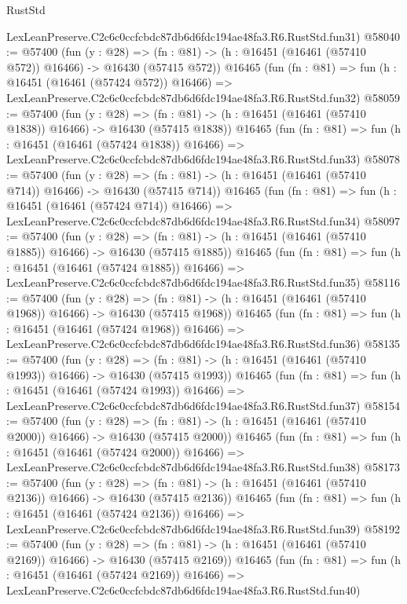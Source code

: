 \begin{lexlean}{RustStd}
\begin{coremodule}
    LexLeanPreserve.C2c6c0ccfcbdc87db6d6fdc194ae48fa3.R6.RustStd.fun31)
@58040 := @57400
    (fun (y : @28) =>
    (fn : @81) -> (h : @16451 (@16461 (@57410 @572)) @16466) -> @16430 (@57415 @572))
    @16465
    (fun (fn : @81) =>
    fun (h : @16451 (@16461 (@57424 @572)) @16466) =>
    LexLeanPreserve.C2c6c0ccfcbdc87db6d6fdc194ae48fa3.R6.RustStd.fun32)
@58059 := @57400
    (fun (y : @28) =>
    (fn : @81) -> (h : @16451 (@16461 (@57410 @1838)) @16466) -> @16430 (@57415 @1838))
    @16465
    (fun (fn : @81) =>
    fun (h : @16451 (@16461 (@57424 @1838)) @16466) =>
    LexLeanPreserve.C2c6c0ccfcbdc87db6d6fdc194ae48fa3.R6.RustStd.fun33)
@58078 := @57400
    (fun (y : @28) =>
    (fn : @81) -> (h : @16451 (@16461 (@57410 @714)) @16466) -> @16430 (@57415 @714))
    @16465
    (fun (fn : @81) =>
    fun (h : @16451 (@16461 (@57424 @714)) @16466) =>
    LexLeanPreserve.C2c6c0ccfcbdc87db6d6fdc194ae48fa3.R6.RustStd.fun34)
@58097 := @57400
    (fun (y : @28) =>
    (fn : @81) -> (h : @16451 (@16461 (@57410 @1885)) @16466) -> @16430 (@57415 @1885))
    @16465
    (fun (fn : @81) =>
    fun (h : @16451 (@16461 (@57424 @1885)) @16466) =>
    LexLeanPreserve.C2c6c0ccfcbdc87db6d6fdc194ae48fa3.R6.RustStd.fun35)
@58116 := @57400
    (fun (y : @28) =>
    (fn : @81) -> (h : @16451 (@16461 (@57410 @1968)) @16466) -> @16430 (@57415 @1968))
    @16465
    (fun (fn : @81) =>
    fun (h : @16451 (@16461 (@57424 @1968)) @16466) =>
    LexLeanPreserve.C2c6c0ccfcbdc87db6d6fdc194ae48fa3.R6.RustStd.fun36)
@58135 := @57400
    (fun (y : @28) =>
    (fn : @81) -> (h : @16451 (@16461 (@57410 @1993)) @16466) -> @16430 (@57415 @1993))
    @16465
    (fun (fn : @81) =>
    fun (h : @16451 (@16461 (@57424 @1993)) @16466) =>
    LexLeanPreserve.C2c6c0ccfcbdc87db6d6fdc194ae48fa3.R6.RustStd.fun37)
@58154 := @57400
    (fun (y : @28) =>
    (fn : @81) -> (h : @16451 (@16461 (@57410 @2000)) @16466) -> @16430 (@57415 @2000))
    @16465
    (fun (fn : @81) =>
    fun (h : @16451 (@16461 (@57424 @2000)) @16466) =>
    LexLeanPreserve.C2c6c0ccfcbdc87db6d6fdc194ae48fa3.R6.RustStd.fun38)
@58173 := @57400
    (fun (y : @28) =>
    (fn : @81) -> (h : @16451 (@16461 (@57410 @2136)) @16466) -> @16430 (@57415 @2136))
    @16465
    (fun (fn : @81) =>
    fun (h : @16451 (@16461 (@57424 @2136)) @16466) =>
    LexLeanPreserve.C2c6c0ccfcbdc87db6d6fdc194ae48fa3.R6.RustStd.fun39)
@58192 := @57400
    (fun (y : @28) =>
    (fn : @81) -> (h : @16451 (@16461 (@57410 @2169)) @16466) -> @16430 (@57415 @2169))
    @16465
    (fun (fn : @81) =>
    fun (h : @16451 (@16461 (@57424 @2169)) @16466) =>
    LexLeanPreserve.C2c6c0ccfcbdc87db6d6fdc194ae48fa3.R6.RustStd.fun40)

\end{coremodule}
\end{lexlean}
